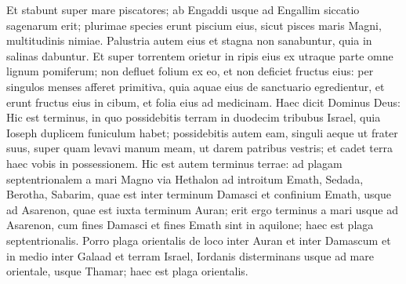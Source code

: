 \begin{biblechapter}
\begin{biblechapter}
\begin{biblechapter}
\begin{biblechapter}
\begin{biblechapter}
\begin{biblechapter}
\begin{biblechapter}
\begin{biblechapter}
\begin{biblechapter}
\begin{biblechapter}
\begin{biblechapter}
\begin{biblechapter}
\begin{biblechapter}
\begin{biblechapter}
\begin{biblechapter}
\begin{biblechapter}
\begin{biblechapter}
\begin{biblechapter}
\begin{biblechapter}
\begin{biblechapter}
\begin{biblechapter}
\begin{biblechapter}
\begin{biblechapter}
\begin{biblechapter}
\begin{biblechapter}
\begin{biblechapter}
\begin{biblechapter}
\begin{biblechapter}
\begin{biblechapter}
\begin{biblechapter}
\begin{biblechapter}
\begin{biblechapter}
\begin{biblechapter}
\begin{biblechapter}
\begin{biblechapter}
\begin{biblechapter}
\begin{biblechapter}
\begin{biblechapter}
\begin{biblechapter}
\begin{biblechapter}
\begin{biblechapter}
\begin{biblechapter}
\begin{biblechapter}
\begin{biblechapter}
\begin{biblechapter}
\begin{biblechapter}
\begin{biblechapter}
\verse Et stabunt super mare piscatores; ab Engaddi usque ad Engallim siccatio sagenarum erit; plurimae species erunt piscium eius, sicut pisces maris Magni, multitudinis nimiae. 
\verse Palustria autem eius et stagna non sanabuntur, quia in salinas dabuntur. 
\verse Et super torrentem orietur in ripis eius ex utraque parte omne lignum pomiferum; non defluet folium ex eo, et non deficiet fructus eius: per singulos menses afferet primitiva, quia aquae eius de sanctuario egredientur, et erunt fructus eius in cibum, et folia eius ad medicinam.
 \verse Haec dicit Dominus Deus: Hic est terminus, in quo possidebitis terram in duodecim tribubus Israel, quia Ioseph duplicem funiculum habet; 
\verse possidebitis autem eam, singuli aeque ut frater suus, super quam levavi manum meam, ut darem patribus vestris; et cadet terra haec vobis in possessionem. 
 \verse Hic est autem terminus terrae: ad plagam septentrionalem a mari Magno via Hethalon ad introitum Emath, 
\verse Sedada, Berotha, Sabarim, quae est inter terminum Damasci et confinium Emath, usque ad Asarenon, quae est iuxta terminum Auran; 
\verse erit ergo terminus a mari usque ad Asarenon, cum fines Damasci et fines Emath sint in aquilone; haec est plaga septentrionalis. 
\verse Porro plaga orientalis de loco inter Auran et inter Damascum et in medio inter Galaad et terram Israel, Iordanis disterminans usque ad mare orientale, usque Thamar; haec est plaga orientalis. 

\end{biblechapter}
\end{biblechapter}
\end{biblechapter}
\end{biblechapter}
\end{biblechapter}
\end{biblechapter}
\end{biblechapter}
\end{biblechapter}
\end{biblechapter}
\end{biblechapter}
\end{biblechapter}
\end{biblechapter}
\end{biblechapter}
\end{biblechapter}
\end{biblechapter}
\end{biblechapter}
\end{biblechapter}
\end{biblechapter}
\end{biblechapter}
\end{biblechapter}
\end{biblechapter}
\end{biblechapter}
\end{biblechapter}
\end{biblechapter}
\end{biblechapter}
\end{biblechapter}
\end{biblechapter}
\end{biblechapter}
\end{biblechapter}
\end{biblechapter}
\end{biblechapter}
\end{biblechapter}
\end{biblechapter}
\end{biblechapter}
\end{biblechapter}
\end{biblechapter}
\end{biblechapter}
\end{biblechapter}
\end{biblechapter}
\end{biblechapter}
\end{biblechapter}
\end{biblechapter}
\end{biblechapter}
\end{biblechapter}
\end{biblechapter}
\end{biblechapter}
\end{biblechapter}
